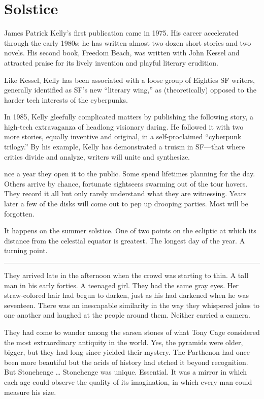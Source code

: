 \chapter{Solstice}

James Patrick Kelly's first publication came in 1975. His career accelerated through the early 1980s; he has written almost two dozen short stories and two novels. His second book, Freedom Beach, was written with John Kessel and attracted praise for its lively invention and playful literary erudition.

Like Kessel, Kelly has been associated with a loose group of Eighties SF writers, generally identified as SF's new ``literary wing,'' as (theoretically) opposed to the harder tech interests of the cyberpunks.

In 1985, Kelly gleefully complicated matters by publishing the following story, a high-tech extravaganza of headlong visionary daring. He followed it with two more stories, equally inventive and original, in a self-proclaimed ``cyberpunk trilogy.'' By his example, Kelly has demonstrated a truism in SF---that where critics divide and analyze, writers will unite and synthesize.

\hrulefill

nce a year they open it to the public. Some spend lifetimes planning for the day. Others arrive by chance, fortunate sightseers swarming out of the tour hovers. They record it all but only rarely understand what they are witnessing. Years later a few of the disks will come out to pep up drooping parties. Most will be forgotten.

It happens on the summer solstice. One of two points on the ecliptic at which its distance from the celestial equator is greatest. The longest day of the year. A turning point.

\fancybreak{* * *}

They arrived late in the afternoon when the crowd was starting to thin. A tall man in his early forties. A teenaged girl. They had the same gray eyes. Her straw-colored hair had begun to darken, just as his had darkened when he was seventeen. There was an inescapable similarity in the way they whispered jokes to one another and laughed at the people around them. Neither carried a camera.

They had come to wander among the sarsen stones of what Tony Cage considered the most extraordinary antiquity in the world. Yes, the pyramids were older, bigger, but they had long since yielded their mystery. The Parthenon had once been more beautiful but the acids of history had etched it beyond recognition. But Stonehenge … Stonehenge was unique. Essential. It was a mirror in which each age could observe the quality of its imagination, in which every man could measure his size.

